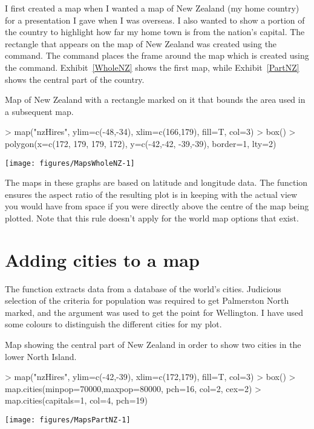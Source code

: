 I first created a map when I wanted a map of New Zealand (my home country) for a presentation I gave when I was overseas. I also wanted to show a portion of the country to highlight how far my home town is from the nation's capital. The rectangle that appears on the map of New Zealand was created using the  command. The  command places the frame around the map which is created using the  command. Exhibit~\ref{WholeNZ} shows the first map, while Exhibit~\ref{PartNZ} shows the central part of the country.
\begin{exhibit}
\caption{Map of New Zealand with a rectangle marked on it that bounds the area used in a subsequent map.}
\label{WholeNZ}
\begin{center}
\begin{Schunk}
\begin{Sinput}
> map("nzHires", ylim=c(-48,-34), xlim=c(166,179), fill=T, col=3)
> box()
> polygon(x=c(172, 179, 179, 172), y=c(-42,-42, -39,-39), border=1, lty=2)
\end{Sinput}

\texttt{[image: figures/MapsWholeNZ-1]} \end{Schunk}
\end{center}
\end{exhibit}

The maps in these graphs are based on latitude and longitude data. The  function ensures the aspect ratio of the resulting plot is in keeping with the actual view you would have from space if you were directly above the centre of the map being plotted. Note that this rule doesn't apply for the world map options that exist.

\section{Adding cities to a map}

The  function extracts data from a database of the world's cities. Judicious selection of the criteria for population was required to get Palmerston North marked, and the  argument was used to get the point for Wellington. I have used some colours to distinguish the different cities for my plot.

\begin{exhibit}
\caption{Map showing the central part of New Zealand in order to show two cities in the lower North Island.}
\label{PartNZ}
\begin{center}
\begin{Schunk}
\begin{Sinput}
> map("nzHires", ylim=c(-42,-39), xlim=c(172,179), fill=T, col=3)
> box()
> map.cities(minpop=70000,maxpop=80000, pch=16, col=2, cex=2)
> map.cities(capitals=1, col=4, pch=19)
\end{Sinput}

\texttt{[image: figures/MapsPartNZ-1]} \end{Schunk}
\end{center}
\end{exhibit}

